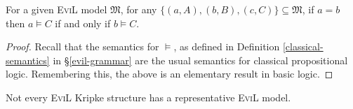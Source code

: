 \begin{lemma}\label{helper-lemma}
  For a given \textsc{EviL} model $\mathfrak{M}$, for any
  $\{(a,A),(b,B),(c,C)\} \subseteq \mathfrak{M}$, if $a = b$ then $a
  \models C$ if and only if $b \models C$.
\end{lemma}
\begin{proof}
  Recall that the semantics for $\models$, as defined in Definition
  \ref{classical-semantics} in \S\ref{evil-grammar} are the usual
  semantics for classical propositional logic. Remembering this, the
  above is an elementary result in basic logic.
\end{proof}

\begin{proposition}
\label{not-an-evil-model}
 Not every \textsc{EviL} Kripke structure has a representative \textsc{EviL} model.
\end{proposition}
